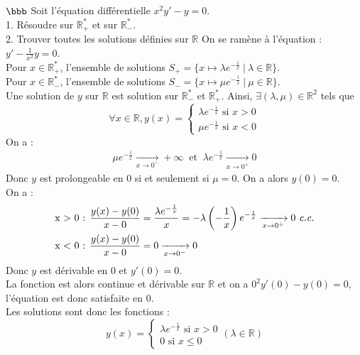 \documentclass[11pt]{article}
\begin{document}
\begin{exercice}{$\bbb$}{}
    Soit l'équation différentielle $x^2y' - y = 0$.\\
    1. Résoudre sur $\mathbb{R}^*_+$ et sur $\mathbb{R}^*_-$.\\
    2. Trouver toutes les solutions définies sur $\mathbb{R}$
    \tcblower
     On se ramène à l'équation : $y' - \frac{1}{x^2}y = 0$.\\
    Pour $x\in\mathbb{R}^*_+$, l'ensemble de solutions $S_+ = \{x\mapsto \lambda e^{-\frac{1}{x}} ~ | ~ \lambda \in \mathbb{R}\}$.\\
    Pour $x\in\mathbb{R}^*_-$, l'ensemble de solutions $S_- = \{x\mapsto \mu e^{-\frac{1}{x}} ~ | ~ \mu \in \mathbb{R}\}$.\\
     Une solution de $y$ sur $\mathbb{R}$ est solution sur $\mathbb{R}^*_-$ et $\mathbb{R}^*_+$. Ainsi, $\exists(\lambda, \mu)\in\mathbb{R}^2$ tels que
    \begin{equation*}
        \forall{x\in\mathbb{R}}, y(x) = \begin{cases} \lambda e^{-\frac{1}{x}} \text{ si } x>0\\ \mu e^{-\frac{1}{x}} \text{ si } x<0\end{cases}
    \end{equation*}
    On a :
    \begin{align*}
        \mu e^{-\frac{1}{x}} \xrightarrow[x\to0^-]{}+\infty ~ \text{ et } ~ \lambda e^{-\frac{1}{x}} \xrightarrow[x\to0^+]{} 0
    \end{align*}
    Donc $y$ est prolongeable en $0$ si et seulement si $\mu=0$. On a alors $y(0)=0$.\\
    On a :
    \begin{align*}
        &\text {x > 0 : } \frac{y(x) - y(0)}{x - 0} = \frac{\lambda e^{-\frac{1}{x}}}{x}=-\lambda\left(-\frac{1}{x}\right)e^{-\frac{1}{x}} \xrightarrow[x\to0^+]{}0 ~ \text{\emph{c.c.}}\\
        &\text {x < 0 : } \frac{y(x) - y(0)}{x - 0} = 0 \xrightarrow[x\to0^-]{} 0
    \end{align*}
    Donc $y$ est dérivable en $0$ et $y'(0)=0$.\\
    La fonction est alors continue et dérivable sur $\mathbb{R}$ et on a $0^2y'(0)-y(0)=0$, l'équation est donc satisfaite en $0$.\\
    Les solutions sont donc les fonctions : 
    \begin{equation*}
        y(x) = \begin{cases}
            \lambda e^{-\frac{1}{x}} \text{ si } x>0\\
            0 \text{ si } x\leq0
        \end{cases}
        (\lambda \in \mathbb{R})
    \end{equation*}
\end{exercice}
\end{document}
